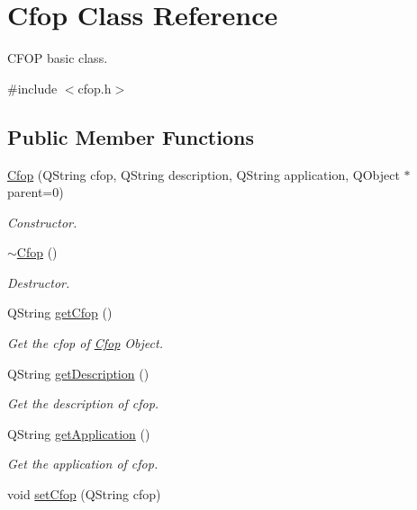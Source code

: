 \hypertarget{class_cfop}{\section{\-Cfop \-Class \-Reference}
\label{class_cfop}
}


\-C\-F\-O\-P basic class.  




{\ttfamily \#include $<$cfop.\-h$>$}

\subsection*{\-Public \-Member \-Functions}
\begin{DoxyCompactItemize}
\item 
\hyperlink{class_cfop_a4437681318a3f5f7148cc1d80c7727c2}{\-Cfop} (\-Q\-String cfop, \-Q\-String description, \-Q\-String application, \-Q\-Object $\ast$parent=0)
\begin{DoxyCompactList}\small\item\em \-Constructor. \end{DoxyCompactList}\item 
\hyperlink{class_cfop_afcd11f99940472d586f064d986585896}{$\sim$\-Cfop} ()
\begin{DoxyCompactList}\small\item\em \-Destructor. \end{DoxyCompactList}\item 
\-Q\-String \hyperlink{class_cfop_a2bb438225b255dc1fa6cfe34c6201f6b}{get\-Cfop} ()
\begin{DoxyCompactList}\small\item\em \-Get the cfop of \hyperlink{class_cfop}{\-Cfop} \-Object. \end{DoxyCompactList}\item 
\-Q\-String \hyperlink{class_cfop_a3708dfece8fd1455fc1d2bc1a976b036}{get\-Description} ()
\begin{DoxyCompactList}\small\item\em \-Get the description of cfop. \end{DoxyCompactList}\item 
\-Q\-String \hyperlink{class_cfop_a0ee00c5503960e65b738488b8121a320}{get\-Application} ()
\begin{DoxyCompactList}\small\item\em \-Get the application of cfop. \end{DoxyCompactList}\item 
void \hyperlink{class_cfop_a86b04fc26f8c6a9f498e1b7cf93f8733}{set\-Cfop} (\-Q\-String cfop)

\end{DoxyCompactItemize}
